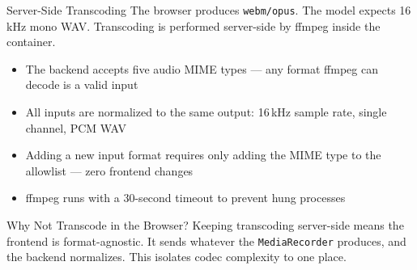 \documentclass{beamer}
\begin{document}
\begin{frame}{Server-Side Transcoding}
    \small
    The browser produces \texttt{webm/opus}. The model expects
    16\,kHz mono WAV. Transcoding is performed server-side by ffmpeg
    inside the container.

    \vspace{0.3em}
    \begin{itemize}\setlength{\itemsep}{2pt}
        \item The backend accepts five audio MIME types --- any format
              ffmpeg can decode is a valid input
        \item All inputs are normalized to the same output:
              16\,kHz sample rate, single channel, PCM WAV
        \item Adding a new input format requires only adding the MIME type
              to the allowlist --- zero frontend changes
        \item ffmpeg runs with a 30-second timeout to prevent hung processes
    \end{itemize}

    \vspace{0.2em}
    \begin{block}{Why Not Transcode in the Browser?}
        Keeping transcoding server-side means the frontend is format-agnostic.
        It sends whatever the \texttt{MediaRecorder} produces, and the
        backend normalizes. This isolates codec complexity to one place.
    \end{block}
\end{frame}
\end{document}
